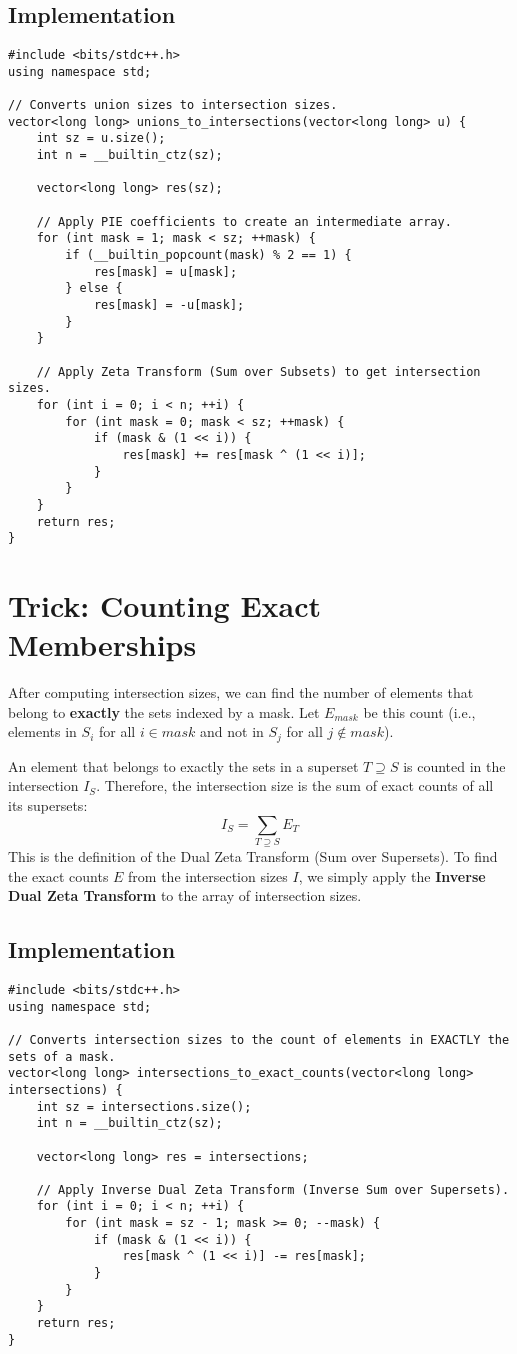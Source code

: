 \documentclass[10pt,a4paper]{article}
\begin{document}
\subsection{Implementation}
\begin{lstlisting}
#include <bits/stdc++.h>
using namespace std;

// Converts union sizes to intersection sizes.
vector<long long> unions_to_intersections(vector<long long> u) {
    int sz = u.size();
    int n = __builtin_ctz(sz);
    
    vector<long long> res(sz);

    // Apply PIE coefficients to create an intermediate array.
    for (int mask = 1; mask < sz; ++mask) {
        if (__builtin_popcount(mask) % 2 == 1) {
            res[mask] = u[mask];
        } else {
            res[mask] = -u[mask];
        }
    }

    // Apply Zeta Transform (Sum over Subsets) to get intersection sizes.
    for (int i = 0; i < n; ++i) {
        for (int mask = 0; mask < sz; ++mask) {
            if (mask & (1 << i)) {
                res[mask] += res[mask ^ (1 << i)];
            }
        }
    }
    return res;
}
\end{lstlisting}

\section{Trick: Counting Exact Memberships}
After computing intersection sizes, we can find the number of elements that belong to \textbf{exactly} the sets indexed by a mask. Let $E_{mask}$ be this count (i.e., elements in $S_i$ for all $i \in mask$ and not in $S_j$ for all $j \notin mask$).

An element that belongs to exactly the sets in a superset $T \supseteq S$ is counted in the intersection $I_S$. Therefore, the intersection size is the sum of exact counts of all its supersets:
$$ I_S = \sum_{T \supseteq S} E_T $$
This is the definition of the Dual Zeta Transform (Sum over Supersets). To find the exact counts $E$ from the intersection sizes $I$, we simply apply the \textbf{Inverse Dual Zeta Transform} to the array of intersection sizes.

\subsection{Implementation}
\begin{lstlisting}
#include <bits/stdc++.h>
using namespace std;

// Converts intersection sizes to the count of elements in EXACTLY the sets of a mask.
vector<long long> intersections_to_exact_counts(vector<long long> intersections) {
    int sz = intersections.size();
    int n = __builtin_ctz(sz);
    
    vector<long long> res = intersections;

    // Apply Inverse Dual Zeta Transform (Inverse Sum over Supersets).
    for (int i = 0; i < n; ++i) {
        for (int mask = sz - 1; mask >= 0; --mask) {
            if (mask & (1 << i)) {
                res[mask ^ (1 << i)] -= res[mask];
            }
        }
    }
    return res;
}
\end{lstlisting}
\end{document}
